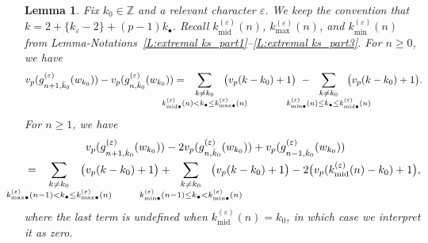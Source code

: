 \documentclass[12pt]{amsart}
\newtheorem{lemma}[subsection]{Lemma}
\theoremstyle{definition}
\numberwithin{equation}{subsection}
\def\ZZ{\mathbb{Z}}
\newcommand{\midd}{\mathrm{mid}}
\begin{document}
\begin{lemma}
\label{L:increment of ghost valuation}
Fix $k_0 \in \ZZ$ and a relevant character $\varepsilon$. 
We keep the convention that $k = 2+\{k_\varepsilon-2\} + (p-1)k_\bullet$. Recall $k_\midd^{(\varepsilon)}(n)$, $k_{\max}^{(\varepsilon)}(n)$, and  $k_{\min}^{(\varepsilon)}(n)$ from Lemma-Notations~\ref{L:extremal ks_part1}--\ref{L:extremal ks_part3}.
For $n \geq 0$, we have
\begin{equation}
\label{E:increment of ghost series valuation 1}
v_p(g_{n+1, \hat k_0}^{(\varepsilon)}(w_{k_0})) - v_p(g_{n, \hat k_0}^{(\varepsilon)}(w_{k_0})) =  \hspace{-25pt}
\sum_{\substack{
k \neq k_0
\\
k^{(\varepsilon)}_{\midd\bullet}(n) < k_\bullet \leq k^{(\varepsilon)}_{{\max}\bullet}(n)}}
\hspace{-25pt}\big( v_p(k-k_0)+1 \big)\ -  \hspace{-25pt} \sum_{\substack{
k \neq k_0\\
k^{(\varepsilon)}_{{\min}\bullet}(n) \leq k_\bullet \leq k^{(\varepsilon)}_{{\midd}\bullet}(n)}}
\hspace{-25pt}\big( v_p(k-k_0)+1 \big).
\end{equation}
For $n \geq 1$, we have 
\begin{align}
\label{E:increment of ghost series valuation 2}
& v_p(g_{n+1, \hat k_0}^{(\varepsilon)}(w_{k_0})) -2v_p(g_{n, \hat k_0}^{(\varepsilon)}(w_{k_0}))  + v_p(g_{n-1, \hat k_0}^{(\varepsilon)}(w_{k_0})) 
\\
\nonumber
=\hspace{-30pt}
\sum_{\substack{
k \neq k_0\\
k^{(\varepsilon)}_{{\max}\bullet}(n-1) < k_\bullet \leq k^{(\varepsilon)}_{{\max}\bullet}(n)}} 
\hspace{-30pt}\big(& v_p(k-k_0)+1 \big)
+\hspace{-30pt}
\sum_{\substack{
k \neq k_0\\
k^{(\varepsilon)}_{{\min}\bullet}(n-1) \leq k_\bullet < k^{(\varepsilon)}_{{\min}\bullet}(n)}}
\hspace{-30pt}\big( v_p(k-k_0)+1 \big)
- 
2 \big( v_p(k_\midd^{(\varepsilon)}(n) - k_0) + 1\big),
\end{align}
where the last term is undefined when $k_{\midd}^{(\varepsilon)}(n)= k_0$, in which case we interpret it as zero.
\end{lemma}
\end{document}
